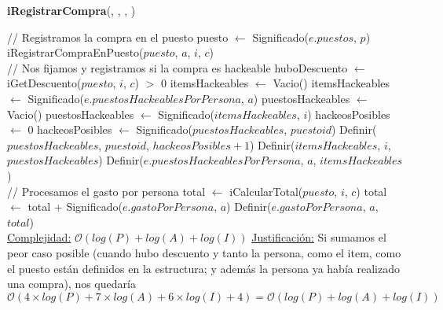 \begin{Algoritmos}
    \begin{algorithm}
    \caption{\textbf{iRegistrarCompra}(, ,  , )}
    \begin{algorithmic}
        \State // Registramos la compra en el puesto
        \State puesto $\gets$ Significado($e.puestos$, $p$)  
        \State iRegistrarCompraEnPuesto($puesto$, $a$, $i$, $c$)  
        \\
        \State // Nos fijamos y registramos si la compra es hackeable
        \State huboDescuento $\gets$ iGetDescuento($puesto$, $i$, $c$) $>$ 0  
          
            \State itemsHackeables $\gets$ Vacio()  
             
                \State itemsHackeables $\gets$ Significado($e.puestosHackeablesPorPersona$, $a$) 
            \EndIf
            \State puestosHackeables $\gets$ Vacio() 
             
                \State puestosHackeables $\gets$ Significado($itemsHackeables$, $i$) 
            \EndIf
            \State hackeosPosibles $\gets$ 0 
             
                \State hackeosPosibles $\gets$ Significado($puestosHackeables$, $puestoid$) 
            \EndIf
            \State Definir($puestosHackeables$, $puestoid$, $hackeosPosibles + 1$) 
            \State Definir($itemsHackeables$, $i$, $puestosHackeables$) 
            \State Definir($e.puestosHackeablesPorPersona$, $a$, $itemsHackeables$) 
        \EndIf
        \\
        \State // Procesamos el gasto por persona
        \State total $\gets$ iCalcularTotal($puesto$, $i$, $c$) 
         
            \State total $\gets$ total + Significado($e.gastoPorPersona$, $a$) 
        \EndIf
        \State Definir($e.gastoPorPersona$, $a$, $total$)  
        \\
        \Statex \underline{Complejidad:} $\mathcal{O}(log(P) + log(A) + log(I))$
        \Statex \underline{Justificación:} Si sumamos el peor caso posible (cuando hubo descuento y tanto la persona, como el item, como el puesto están definidos en la estructura; y además la persona ya había realizado una compra), nos quedaría $\mathcal{O}(4 \times log(P) + 7 \times log(A) + 6 \times log(I) + 4) = \mathcal{O}(log(P) + log(A) + log(I))$
    \end{algorithmic}
    \end{algorithm}
\end{Algoritmos}